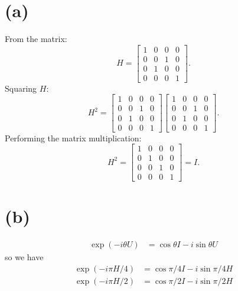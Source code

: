 \documentclass{article}
\begin{document}
\section*{(a)}
From the matrix:
\[
H = \begin{bmatrix}
1 & 0 & 0 & 0 \\
0 & 0 & 1 & 0 \\
0 & 1 & 0 & 0 \\
0 & 0 & 0 & 1
\end{bmatrix}.
\]
Squaring \( H \):
\[
H^2 = \begin{bmatrix}
1 & 0 & 0 & 0 \\
0 & 0 & 1 & 0 \\
0 & 1 & 0 & 0 \\
0 & 0 & 0 & 1
\end{bmatrix}
\begin{bmatrix}
1 & 0 & 0 & 0 \\
0 & 0 & 1 & 0 \\
0 & 1 & 0 & 0 \\
0 & 0 & 0 & 1
\end{bmatrix}.
\]
Performing the matrix multiplication:
\[
H^2 = \begin{bmatrix}
1 & 0 & 0 & 0 \\
0 & 1 & 0  & 0 \\
0 & 0 & 1 & 0 \\
0 & 0 & 0 & 1
\end{bmatrix} = I.
\]

\section*{(b)}
\begin{align*}
   \exp(-i \theta U) &= \cos\theta I - i \sin\theta U 
\end{align*}
so we have
\begin{align*}
   \exp(-i\pi H/4) &= \cos\pi/4 I - i \sin\pi/4 H \\
   \exp(-i\pi H/2) &= \cos\pi/2 I - i \sin\pi/2 H
\end{align*}
\end{document}
